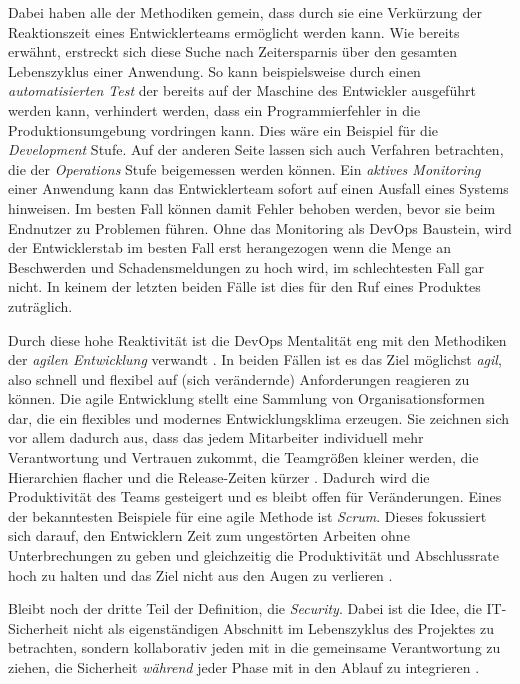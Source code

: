 Dabei haben alle der Methodiken gemein, dass durch sie eine Verkürzung der Reaktionszeit eines Entwicklerteams ermöglicht werden kann. 
Wie bereits erwähnt, erstreckt sich diese Suche nach Zeitersparnis über den gesamten Lebenszyklus einer Anwendung. So kann beispielsweise durch einen \emph{automatisierten Test} der bereits auf der Maschine des Entwickler ausgeführt werden kann, verhindert werden, dass ein Programmierfehler in die Produktionsumgebung vordringen kann. Dies wäre ein Beispiel für die \emph{Development} Stufe. Auf der anderen Seite lassen sich auch Verfahren betrachten, die der \emph{Operations} Stufe beigemessen werden können. Ein \emph{aktives Monitoring} einer Anwendung kann das Entwicklerteam sofort auf einen Ausfall eines Systems hinweisen. Im besten Fall können damit Fehler behoben werden, bevor sie beim Endnutzer zu Problemen führen. Ohne das Monitoring als DevOps Baustein, wird der Entwicklerstab im besten Fall erst herangezogen wenn die Menge an Beschwerden und Schadensmeldungen zu hoch wird, im schlechtesten Fall gar nicht. In keinem der letzten beiden Fälle ist dies für den Ruf eines Produktes zuträglich.

Durch diese hohe Reaktivität ist die DevOps Mentalität eng mit den Methodiken der \emph{agilen Entwicklung} verwandt \cite{haufe-lexwaregmbhcokgAgileMethodenDefinition}. In beiden Fällen ist es das Ziel möglichst \emph{agil}, also schnell und flexibel auf (sich verändernde) Anforderungen reagieren zu können.
Die agile Entwicklung stellt eine Sammlung von Organisationsformen dar, die ein flexibles und modernes Entwicklungsklima erzeugen. Sie zeichnen sich vor allem dadurch aus, dass das jedem Mitarbeiter individuell mehr Verantwortung und Vertrauen zukommt, die Teamgrößen kleiner werden, die Hierarchien flacher und die Release-Zeiten kürzer \cite{haufe-lexwaregmbhcokgAgileMethodenDefinition}. Dadurch wird die Produktivität des Teams gesteigert und es bleibt offen für Veränderungen. Eines der bekanntesten Beispiele für eine agile Methode ist \emph{Scrum}. Dieses fokussiert sich darauf, den Entwicklern Zeit zum ungestörten Arbeiten ohne Unterbrechungen zu geben und gleichzeitig die Produktivität und Abschlussrate hoch zu halten und das Ziel nicht aus den Augen zu verlieren \cite{froemlingAgileMethodenWas2021}.

Bleibt noch der dritte Teil der Definition, die \emph{Security}. Dabei ist die Idee, die IT-Sicherheit nicht als eigenständigen Abschnitt im Lebenszyklus des Projektes zu betrachten, sondern kollaborativ jeden mit in die gemeinsame Verantwortung zu ziehen, die Sicherheit \emph{während} jeder Phase mit in den Ablauf zu integrieren \cite{redheadWasIstDevSecOps}.

